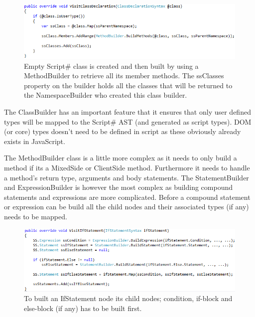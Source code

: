 	\begin{figure}[H]
		\begin{center}
			\centerline{\includegraphics[width=16cm]{resources/images/VisitClassDeclaration.png}}
		\end{center}
		\caption{Empty Script\# class is created and then built by using a MethodBuilder to retrieve all its member methods. The ssClasses property on the builder holds all the classes that will be returned to the NamespaceBuilder who created this class builder.}
		\label{visitClassDeclaration}
	\end{figure}

	The ClassBuilder has an important feature that it ensures that only user defined types will be mapped to the Script\# AST (and generated as script types). DOM (or core) types doesn’t need to be defined in script as these obviously already exists in JavaScript.

	The MethodBuilder class is a little more complex as it needs to only build a method if its a MixedSide or ClientSide method. Furthermore it needs to handle a method’s return type, arguments and body statements. The StatementBuilder and ExpressionBuilder is however the most complex as building compound statements and expressions are more complicated. Before a compound statement or expression can be build all the child nodes and their associated types (if any) needs to be mapped.

	\begin{figure}[H]
		\begin{center}
			\centerline{\includegraphics[width=16cm]{resources/images/VisitIfStatement.png}}
		\end{center}
		\caption{To built an IfStatement node its child nodes; condition, if-block and else-block (if any) has to be built first.}
		\label{visitIfStatement}
	\end{figure}

